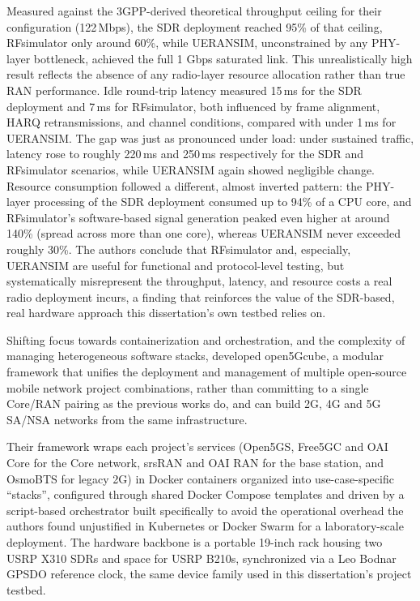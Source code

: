 Measured against the 3GPP-derived theoretical throughput ceiling for their configuration (122\,Mbps), the \gls{SDR} deployment reached 95\% of that ceiling, RFsimulator only around 60\%, while UERANSIM, unconstrained by any \gls{PHY}-layer bottleneck, achieved the full 1 Gbps saturated link. This unrealistically high result reflects the absence of any radio-layer resource allocation rather than true \gls{RAN} performance. Idle round-trip latency measured 15\,ms for the \gls{SDR} deployment and 7\,ms for RFsimulator, both influenced by frame alignment, HARQ retransmissions, and channel conditions, compared with under 1\,ms for UERANSIM. The gap was just as pronounced under load: under sustained traffic, latency rose to roughly 220\,ms and 250\,ms respectively for the \gls{SDR} and RFsimulator scenarios, while UERANSIM again showed negligible change. Resource consumption followed a different, almost inverted pattern: the \gls{PHY}-layer processing of the \gls{SDR} deployment consumed up to 94\% of a CPU core, and RFsimulator's software-based signal generation peaked even higher at around 140\% (spread across more than one core), whereas UERANSIM never exceeded roughly 30\%. The authors conclude that RFsimulator and, especially, UERANSIM are useful for functional and protocol-level testing, but systematically misrepresent the throughput, latency, and resource costs a real radio deployment incurs, a finding that reinforces the value of the \gls{SDR}-based, real hardware approach this dissertation's own testbed relies on.

Shifting focus towards containerization and orchestration, and the complexity of managing heterogeneous software stacks, \textcite{horstmann2025open5gcube} developed open5Gcube, a modular framework that unifies the deployment and management of multiple open-source mobile network project combinations, rather than committing to a single Core/\gls{RAN} pairing as the previous works do, and can build 2G, 4G and 5G \gls{SA}/\gls{NSA} networks from the same infrastructure.

Their framework wraps each project's services (Open5GS, Free5GC and \gls{OAI} Core for the Core network, srsRAN and \gls{OAI} \gls{RAN} for the base station, and OsmoBTS for legacy 2G) in Docker containers organized into use-case-specific ``stacks'', configured through shared Docker Compose templates and driven by a script-based orchestrator built specifically to avoid the operational overhead the authors found unjustified in Kubernetes or Docker Swarm for a laboratory-scale deployment. The hardware backbone is a portable 19-inch rack housing two USRP X310 \glspl{SDR} and space for USRP B210s, synchronized via a Leo Bodnar \gls{GPSDO} reference clock, the same device family used in this dissertation's project testbed.

